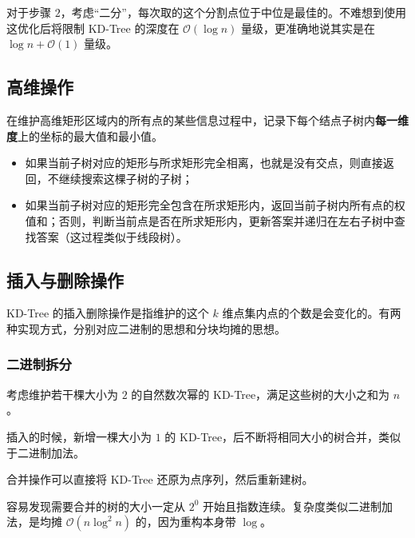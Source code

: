对于步骤 $2$，考虑“二分”，每次取的这个分割点位于中位是最佳的。不难想到使用这优化后将限制 KD-Tree 的深度在 $\mathcal O\left(\log n\right)$ 量级，更准确地说其实是在 $\log n + \mathcal O(1)$ 量级。

\subsection{高维操作}

在维护高维矩形区域内的所有点的某些信息过程中，记录下每个结点子树内\textbf{每一维度}上的坐标的最大值和最小值。

\begin{itemize}
\item 如果当前子树对应的矩形与所求矩形完全相离，也就是没有交点，则直接返回，不继续搜索这棵子树的子树；

\item 如果当前子树对应的矩形完全包含在所求矩形内，返回当前子树内所有点的权值和；否则，判断当前点是否在所求矩形内，更新答案并递归在左右子树中查找答案（这过程类似于线段树）。
\end{itemize}

\subsection{插入与删除操作}
KD-Tree 的插入删除操作是指维护的这个 $k$ 维点集内点的个数是会变化的。有两种实现方式，分别对应二进制的思想和分块均摊的思想。

\subsubsection{二进制拆分}

考虑维护若干棵大小为 $2$ 的自然数次幂的 KD-Tree，满足这些树的大小之和为 $n$。

插入的时候，新增一棵大小为 $1$ 的 KD-Tree，后不断将相同大小的树合并，类似于二进制加法。

合并操作可以直接将 KD-Tree 还原为点序列，然后重新建树。

容易发现需要合并的树的大小一定从 $2^0$ 开始且指数连续。复杂度类似二进制加法，是均摊 $\mathcal O(n\log^2 n)$ 的，因为重构本身带 $ \log $。